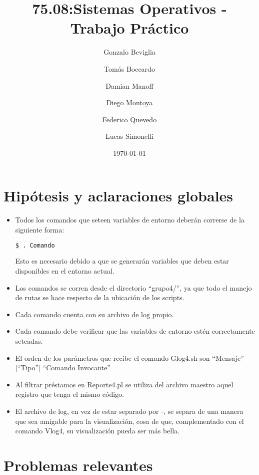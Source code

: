 \documentclass{article}
\title{ 75.08:Sistemas Operativos - Trabajo Práctico }
\author{ Gonzalo Beviglia \and Tomás Boccardo \and Damian Manoff \and Diego Montoya \and Federico Quevedo \and Lucas Simonelli}
\date{ \today }
\begin{document}
		
		\maketitle
		\tableofcontents
		
		\newpage
		

\section{Hipótesis y aclaraciones globales}
\begin{itemize}
	\item Todos los comandos que seteen variables de entorno deberán correrse de la siguiente forma:
			
	\begin{lstlisting}[language=bash] 
		$ . Comando
	\end{lstlisting}
	
	Esto es necesario debido a que se generarán variables que deben estar disponibles en el entorno actual.
	
	\item Los comandos se corren desde el directorio ``grupo4/'', ya que todo el manejo de rutas se hace respecto
	de la ubicación de los scripts.
	
	\item Cada comando cuenta con su archivo de log propio.
	
	\item Cada comando debe verificar que las variables de entorno estén correctamente seteadas.	
	
	\item El orden de los parámetros que recibe el comando Glog4.sh son ``Mensaje'' [``Tipo''] ``Comando Invocante''
	
	\item Al filtrar préstamos en Reporte4.pl se utiliza del archivo maestro aquel registro que tenga el mismo
	código.
	
	\item El archivo de log, en vez de estar separado por -, se separa de una manera que sea amigable para la visualización,
	cosa de que, complementado con el comando Vlog4, su visualización pueda ser más bella.
	
\end{itemize}

\newpage
\section {Problemas relevantes}
\end{document}

